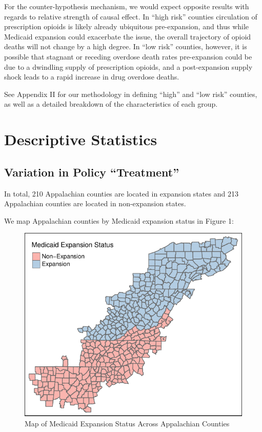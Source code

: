\documentclass[
  11pt,
]{article}
\begin{document}
For the counter-hypothesis mechanism, we would expect opposite results
with regards to relative strength of causal effect. In ``high risk''
counties circulation of prescription opioids is likely already
ubiquitous pre-expansion, and thus while Medicaid expansion could
exacerbate the issue, the overall trajectory of opioid deaths will not
change by a high degree. In ``low risk'' counties, however, it is
possible that stagnant or receding overdose death rates pre-expansion
could be due to a dwindling supply of prescription opioids, and a
post-expansion supply shock leads to a rapid increase in drug overdose
deaths.

See Appendix II for our methodology in defining ``high'' and ``low
risk'' counties, as well as a detailed breakdown of the characteristics
of each group.

\medspace

\hypertarget{descriptive-statistics}{%
\section{Descriptive Statistics}\label{descriptive-statistics}}

\hypertarget{variation-in-policy-treatment}{%
\subsection{Variation in Policy
``Treatment''}\label{variation-in-policy-treatment}}

In total, 210 Appalachian counties are located in expansion states and
213 Appalachian counties are located in non-expansion states.

We map Appalachian counties by Medicaid expansion status in Figure 1:

\begin{figure}
\centering
\includegraphics{figs/fig1.pdf}
\caption{Map of Medicaid Expansion Status Across Appalachian Counties}
\end{figure}
\end{document}
